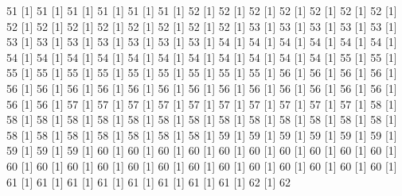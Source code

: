 \documentclass[12pt]{article}
\begin{document}
\begin{Schunk}
\begin{Soutput}
[1] 51%
[1] 51%
[1] 51%
[1] 51%
[1] 51%
[1] 51%
[1] 52%
[1] 52%
[1] 52%
[1] 52%
[1] 52%
[1] 52%
[1] 52%
[1] 52%
[1] 52%
[1] 52%
[1] 52%
[1] 52%
[1] 52%
[1] 52%
[1] 52%
[1] 53%
[1] 53%
[1] 53%
[1] 53%
[1] 53%
[1] 53%
[1] 53%
[1] 53%
[1] 53%
[1] 53%
[1] 53%
[1] 53%
[1] 54%
[1] 54%
[1] 54%
[1] 54%
[1] 54%
[1] 54%
[1] 54%
[1] 54%
[1] 54%
[1] 54%
[1] 54%
[1] 54%
[1] 54%
[1] 54%
[1] 54%
[1] 54%
[1] 54%
[1] 55%
[1] 55%
[1] 55%
[1] 55%
[1] 55%
[1] 55%
[1] 55%
[1] 55%
[1] 55%
[1] 55%
[1] 55%
[1] 56%
[1] 56%
[1] 56%
[1] 56%
[1] 56%
[1] 56%
[1] 56%
[1] 56%
[1] 56%
[1] 56%
[1] 56%
[1] 56%
[1] 56%
[1] 56%
[1] 56%
[1] 56%
[1] 56%
[1] 56%
[1] 56%
[1] 57%
[1] 57%
[1] 57%
[1] 57%
[1] 57%
[1] 57%
[1] 57%
[1] 57%
[1] 57%
[1] 57%
[1] 58%
[1] 58%
[1] 58%
[1] 58%
[1] 58%
[1] 58%
[1] 58%
[1] 58%
[1] 58%
[1] 58%
[1] 58%
[1] 58%
[1] 58%
[1] 58%
[1] 58%
[1] 58%
[1] 58%
[1] 58%
[1] 58%
[1] 58%
[1] 58%
[1] 59%
[1] 59%
[1] 59%
[1] 59%
[1] 59%
[1] 59%
[1] 59%
[1] 59%
[1] 59%
[1] 60%
[1] 60%
[1] 60%
[1] 60%
[1] 60%
[1] 60%
[1] 60%
[1] 60%
[1] 60%
[1] 60%
[1] 60%
[1] 60%
[1] 60%
[1] 60%
[1] 60%
[1] 60%
[1] 60%
[1] 60%
[1] 60%
[1] 60%
[1] 60%
[1] 60%
[1] 60%
[1] 61%
[1] 61%
[1] 61%
[1] 61%
[1] 61%
[1] 61%
[1] 61%
[1] 61%
[1] 62%
[1] 62%

\end{Soutput}
\end{Schunk}
\end{document}
